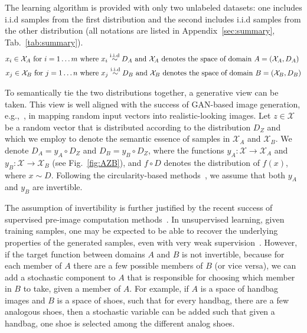 \documentclass{article} %
\begin{document}
The learning algorithm is provided with only two unlabeled datasets: one includes i.i.d samples from the first distribution and the second includes i.i.d samples from the other distribution (all notations are listed in Appendix~\ref{sec:summary}, Tab.~\ref{tab:summary}). 
\begin{equation}
\begin{aligned}
x_i \in \mathcal X_A\textnormal{ for } i=1\dots m &\text{ where } x_i \stackrel{\textnormal{i.i.d}}{\sim} D_A{\textnormal{ and }}\mathcal{X}_A{\textnormal{ denotes the space of domain $A = (\mathcal{X}_A,D_A)$}}\\
x_j \in \mathcal X_B\textnormal{ for } j=1\dots n &\text{ where } x_j \stackrel{\textnormal{i.i.d}}{\sim} D_B {\textnormal{ and }}\mathcal{X}_B{\textnormal{ denotes the space of domain $B = (\mathcal{X}_B,D_B)$}}
\end{aligned}
\end{equation}

To semantically tie the two distributions together, a generative view can be taken. This view is well aligned with the success of GAN-based image generation, e.g.,~\citep{dcgan}, in mapping random input vectors into realistic-looking images. Let $z\in\mathcal{X}$ be a random vector that is distributed according to the distribution $D_Z$ and which we employ to denote the semantic essence of samples in $\mathcal{X}_A$ and $\mathcal{X}_B$. We  denote $D_A = y_A \circ D_Z$ and $D_B = y_B \circ D_Z$,
where the functions $y_A: \mathcal{X} \rightarrow \mathcal{X}_A$ and $y_B: \mathcal{X} \rightarrow \mathcal{X}_B$ (see Fig.~\ref{fig:AZB}), and $f \circ D$ denotes the distribution of $f(x)$, where $x\sim D$. Following the circularity-based methods~\citep{xia2016dual,discogan,CycleGAN2017,dualgan}, we assume that both $y_A$ and $y_B$ are invertible.

The assumption of invertibility is further justified by the recent success of supervised pre-image computation methods~\citep{Dosovitskiy_2016_CVPR}. In unsupervised learning, given training samples, one may be expected to be able to recover the underlying properties of the generated samples, even with very weak supervision~\citep{infogan}. However, if the target function between domains $A$ and $B$ is not invertible, because for each member of $A$ there are a few possible members of $B$ (or vice versa), we can add a stochastic component to $A$ that is responsible for choosing which member in $B$ to take, given a member of $A$. For example, if $A$ is a space of handbag images and $B$ is a space of shoes, such that for every handbag, there are a few analogous shoes, then a stochastic variable can be added such that given a handbag, one shoe is selected among the different analog shoes.
\end{document}
